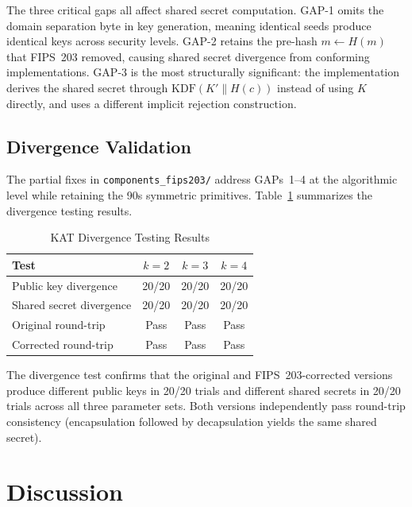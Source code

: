 \documentclass[journal]{IEEEtran}
\begin{document}
The three critical gaps all affect shared secret computation. GAP-1 omits the domain separation byte in key generation, meaning identical seeds produce identical keys across security levels. GAP-2 retains the pre-hash $m \leftarrow H(m)$ that FIPS~203 removed, causing shared secret divergence from conforming implementations. GAP-3 is the most structurally significant: the implementation derives the shared secret through $\mathrm{KDF}(K' \| H(c))$ instead of using $K$ directly, and uses a different implicit rejection construction.

\subsection{Divergence Validation}

The partial fixes in \texttt{components\_fips203/} address GAPs~1--4 at the algorithmic level while retaining the 90s symmetric primitives. Table~\ref{tab:divergence} summarizes the divergence testing results.

\begin{table}[!t]
\renewcommand{\arraystretch}{1.15}
\caption{KAT Divergence Testing Results}
\label{tab:divergence}
\centering
\begin{tabular}{l c c c}
\toprule
\textbf{Test} & \textbf{$k=2$} & \textbf{$k=3$} & \textbf{$k=4$} \\
\midrule
Public key divergence & 20/20 & 20/20 & 20/20 \\
Shared secret divergence & 20/20 & 20/20 & 20/20 \\
Original round-trip & Pass & Pass & Pass \\
Corrected round-trip & Pass & Pass & Pass \\
\bottomrule
\end{tabular}
\end{table}

The divergence test confirms that the original and FIPS~203-corrected versions produce different public keys in 20/20 trials and different shared secrets in 20/20 trials across all three parameter sets. Both versions independently pass round-trip consistency (encapsulation followed by decapsulation yields the same shared secret).


\section{Discussion}
\end{document}
